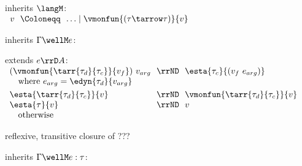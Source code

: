 \begin{flushleft}

\begin{minipage}[t]{\columnwidth}
 inherits $\langM$:\\
$\begin{array}{l@{~~}c@{~~}l}
  v & \Coloneqq & \ldots \mid \vmonfun{(\tau\tarrow\tau)}{v}
\end{array}$

\medskip
{} inherits $\Gamma \wellM e$:\\
\begin{mathpar}
\end{mathpar}

\medskip
{} extends $e \rrD A$:\\
$\begin{array}{l@{~~}c@{~~}l}
  (\vmonfun{\tarr{\tau_d}{\tau_c}}{v_f})~v_{arg} & \rrND & \esta{\tau_c}{(v_f~e_{arg})}
\\ \multicolumn{3}{l}{\mbox{\quad where $e_{arg} = \edyn{\tau_d}{v_{arg}}$}}
\\[0.8ex]
  \esta{\tarr{\tau_d}{\tau_c}}{v} & \rrND & \vmonfun{\tarr{\tau_d}{\tau_c}}{v}
\\
  \esta{\tau}{v} & \rrND & v
\\ \multicolumn{3}{l}{\mbox{\quad otherwise}}
\end{array}$

\medskip
{} reflexive, transitive closure of ??? %
\smallskip
\end{minipage}%
\begin{minipage}[t]{\columnwidth}
 inherits $\Gamma \wellM e : \tau$:
\begin{mathpar}
\end{mathpar}


\end{minipage}
\end{flushleft}
